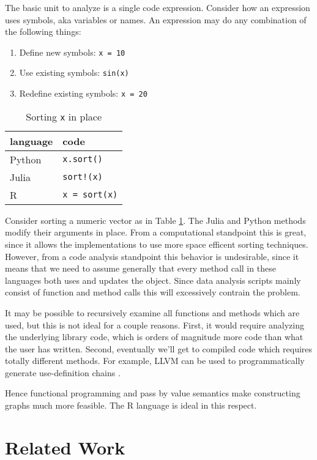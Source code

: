 \documentclass[12pt]{article}
\begin{document}
The basic unit to analyze is a single code expression.
Consider how an expression uses symbols, aka variables or names.
An expression may do any combination of the following things:
\begin{enumerate}
    \item Define new symbols: \texttt{x = 10}
    \item Use existing symbols: \texttt{sin(x)}
    \item Redefine existing symbols: \texttt{x = 20}
\end{enumerate}

\begin{table}[]
\centering
    \caption{Sorting \texttt{x} in place}
\label{tab-sort}
\begin{tabular}{ll}
    \textbf{language} & \textbf{code}        \\
\hline
    Python   & \texttt{x.sort()}    \\
    Julia    & \texttt{sort!(x)}    \\
    R        & \texttt{x = sort(x)}
\end{tabular}
\end{table}

Consider sorting a numeric vector as in Table \ref{tab-sort}.
The Julia and Python methods modify their arguments in place.  From a
computational standpoint this is great, since it allows the implementations
to use more space efficent sorting techniques. However, from a code
analysis standpoint this behavior is undesirable, since it means that we
need to assume generally that every method call in these languages both
uses and updates the object. Since data analysis scripts mainly consist of
function and method calls this will excessively contrain the problem.

It may be possible to recursively examine all functions and methods which
are used, but this is not ideal for a couple reasons. First, it would
require analyzing the underlying library code, which is orders of magnitude
more code than what the user has written. Second, eventually we'll get to
compiled code which requires totally different methods. For example, LLVM
can be used to programmatically generate use-definition chains
\cite{lattner2004llvm}.

Hence functional programming and pass by value semantics make constructing
graphs much more feasible. The R language is ideal in this respect.

\section{Related Work}
\end{document}
